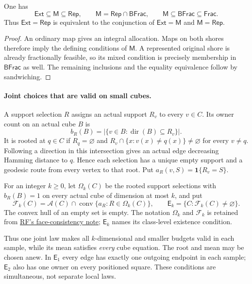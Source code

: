 \begin{proposition}
\label{prop:refinement-mixed-chain}
One has
\[
 \mathsf{Ext}\subseteq\mathsf M\subseteq\mathsf{Rep},\qquad
 \mathsf M=\mathsf{Rep}\cap\mathsf{BFrac},\qquad
 \mathsf M\subseteq\mathsf{BFrac}\subseteq\mathsf{Frac}.
\]
Thus $\mathsf{Ext}=\mathsf{Rep}$ is equivalent to the conjunction of
$\mathsf{Ext}=\mathsf M$ and $\mathsf M=\mathsf{Rep}$.
\end{proposition}
\begin{proof}
An ordinary map gives an integral allocation. Maps on both shores
therefore imply the defining conditions of $\mathsf M$.
A represented original shore is already fractionally feasible, so its
mixed condition is precisely membership in $\mathsf{BFrac}$ as well.
The remaining inclusions and the equality equivalence follow by sandwiching.
\end{proof}

\paragraph{Joint choices that are valid on small cubes.}
A support selection $R$ assigns an actual support $R_v$ to every $v\in C$.
Its owner count on an actual cube $B$ is
\[
 b_R(B)=|\{v\in B:\operatorname{dir}(B)\subseteq R_v\}|.
\]
It is rooted at $q\in C$ if $R_q=\varnothing$ and
$R_v\cap\{x:v(x)\ne q(x)\}\ne\varnothing$ for every $v\ne q$.
Following a direction in this intersection gives an actual edge decreasing
Hamming distance to $q$. Hence each selection has a unique empty support
and a geodesic route from every vertex to that root.
Put $a_R(v,S)=\mathbf1\{R_v=S\}$.

\begin{definition}
\label{def:refinement-edge-coupling}
For an integer $k\ge0$, let $\Omega_k(C)$ be the rooted support selections
with $b_R(B)=1$ on every actual cube of dimension at most $k$, and put
\[
 \mathcal F_k(C)=\mathcal A(C)\cap
              \operatorname{conv}\{a_R:R\in\Omega_k(C)\},
 \qquad
 \mathsf E_k=\{C:\mathcal F_k(C)\ne\varnothing\}.
\]
The convex hull of an empty set is empty. The notation $\Omega_k$ and
$\mathcal F_k$ is retained from
\href{../containment-rep-frac/sections/face_consistent_coupling.tex}{RF's face-consistency note};
$\mathsf E_k$ names its class-level existence condition.
\end{definition}

Thus one joint law makes all $k$-dimensional and smaller budgets valid in
each sample, while its mean satisfies \emph{every} cube equation. The root
and mean may be chosen anew. In $\mathsf E_1$ every edge has exactly one
outgoing endpoint in each sample; $\mathsf E_2$ also has one owner on every
positioned square. These conditions are simultaneous, not separate local laws.

